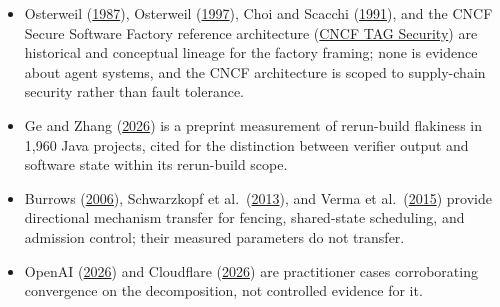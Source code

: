 \begin{itemize}
\tightlist
\item
  Osterweil (\href{https://dl.acm.org/doi/10.5555/41765.41766}{1987}), Osterweil (\href{https://dl.acm.org/doi/10.1145/253228.253440}{1997}), Choi and Scacchi (\href{https://www.ics.uci.edu/~wscacchi/Software-Process/Readings/DistSysFactory.pdf}{1991}), and the CNCF Secure Software Factory reference architecture (\href{https://tag-security.cncf.io/community/working-groups/supply-chain-security/secure-software-factory/secure-software-factory/}{CNCF TAG Security}) are historical and conceptual lineage for the factory framing; none is evidence about agent systems, and the CNCF architecture is scoped to supply-chain security rather than fault tolerance.
\item
  Ge and Zhang (\href{https://arxiv.org/abs/2602.02307}{2026}) is a preprint measurement of rerun-build flakiness in 1,960 Java projects, cited for the distinction between verifier output and software state within its rerun-build scope.
\item
  Burrows (\href{https://www.usenix.org/conference/osdi-06/chubby-lock-service-loosely-coupled-distributed-systems}{2006}), Schwarzkopf et al.~(\href{https://research.google/pubs/omega-flexible-scalable-schedulers-for-large-compute-clusters/}{2013}), and Verma et al.~(\href{https://research.google/pubs/large-scale-cluster-management-at-google-with-borg/}{2015}) provide directional mechanism transfer for fencing, shared-state scheduling, and admission control; their measured parameters do not transfer.
\item
  OpenAI (\href{https://openai.com/index/open-source-codex-orchestration-symphony/}{2026}) and Cloudflare (\href{https://blog.cloudflare.com/astro-issue-triage/}{2026}) are practitioner cases corroborating convergence on the decomposition, not controlled evidence for it.
\end{itemize}
